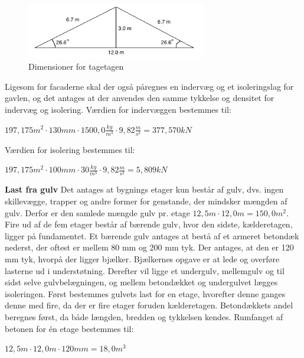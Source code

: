\begin{figure}[htbp]
	\centering
	\includegraphics[width=0.7\textwidth]{billeder/Tagmedvinkel.png}
	\caption{Dimensioner for tagetagen}
	\label{fig:tagetage}
\end{figure}

Ligesom for facaderne skal der også påregnes en indervæg og et isoleringslag for gavlen, og det antages at der anvendes den samme tykkelse og densitet for indervæg og isolering.
\newline
\newline
Værdien for indervæggen bestemmes til:
\begin{center}
	$197,\!175 m^2\cdot 130 mm\cdot 1500,\!0 \frac{kg}{m^3}\cdot 9,\!82 \frac{m}{s^2}=377,\!570 kN$
\end{center}

Værdien for isolering bestemmes til:
\begin{center}
	$197,\!175 m^2\cdot 100 mm\cdot 30 \frac{kg}{m^3}\cdot 9,\!82 \frac{m}{s^2}=5,\!809 kN$
\end{center}

\textbf{Last fra gulv}
\newline
Det antages at bygnings etager kun består af gulv, dvs. ingen skillevægge, trapper og andre former for genstande, der mindsker mængden af gulv. Derfor er den samlede mængde gulv pr. etage $12,\!5 m\cdot 12,\!0 m=150,\!0 m^2$.
\newline \indent{     }  Fire ud af de fem etager består af bærende gulv, hvor den sidste, kælderetagen, ligger på fundamentet. Et bærende gulv antages at bestå af et armeret betondæk nederst, der oftest er mellem 80 mm og 200 mm tyk. Der antages, at den er 120 mm tyk, hvorpå der ligger bjælker. Bjælkernes opgave er at lede og overføre lasterne ud i understøtning. Derefter vil ligge et undergulv, mellemgulv og til sidst selve gulvbelægningen, og mellem betondækket og undergulvet lægges isoleringen. 
\newline \indent{     }  Først bestemmes gulvets last for en etage, hvorefter denne ganges denne med fire, da der er fire etager foruden kælderetagen. Betondækkets andel beregnes først, da både længden, bredden og tykkelsen kendes. 
\newline
\newline
Rumfanget af betonen for én etage bestemmes til:
\begin{center}
	$12,\!5 m\cdot 12,\!0 m\cdot 120 mm=18,\!0 m^3$
\end{center}

